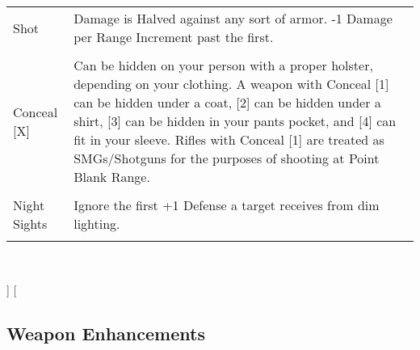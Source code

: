 \documentclass[a4paper, twocolumn, openany]{book}
\begin{document}
{{{\begin{tabular}{lp{14cm}}
	Shot 				& Damage is Halved against any sort of armor. -1 Damage per Range Increment past the first.\\ \\
	Conceal [X] 		& Can be hidden on your person with a proper holster, depending on your clothing. A weapon with Conceal [1] can be hidden under a coat, [2] can be hidden under a shirt, [3] can be hidden in your pants pocket, and [4] can fit in your sleeve. Rifles with Conceal [1] are treated as SMGs/Shotguns for the purposes of shooting at Point Blank Range.\\ \\
	Night Sights 		& Ignore the first +1 Defense a target receives from dim lighting.\\
	\\ \hline
	\end{tabular}\\[\baselineskip] }
}]
\twocolumn[{
	\setlength{\parindent}{10.00002pt}

	\subsection{Weapon Enhancements}

}}
\end{document}
